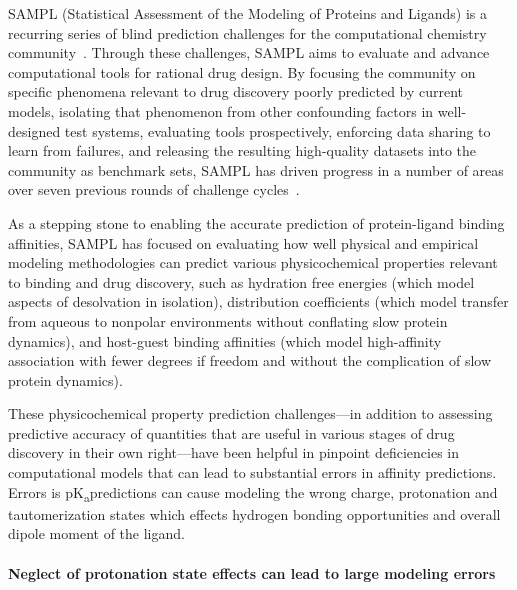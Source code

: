 \documentclass[9pt,lineno]{elife}
\newcommand{\pKa}{pK\textsubscript{a}}
\begin{document}
SAMPL (Statistical Assessment of the Modeling of Proteins and Ligands) is a recurring series of blind prediction challenges for the computational chemistry community~\citep{mobley_advancing_2016, sample_D3R_website}. Through these challenges, SAMPL aims to evaluate and advance computational tools for rational drug design. By focusing the community on specific phenomena relevant to drug discovery poorly predicted by current models, isolating that phenomenon from other confounding factors in well-designed test systems, evaluating tools prospectively, enforcing data sharing to learn from failures, and releasing the resulting high-quality datasets into the community as benchmark sets, SAMPL has driven progress in a number of areas over seven previous rounds of challenge cycles~\cite{nicholls_predicting_2008,guthrie_blind_2009,skillman_sampl2_2010,geballe_sampl2_2010,skillman_sampl3_2012,skillman_sampl3_2012,geballe_sampl3_2012,muddana_sampl3_2012,guthrie_sampl4_2014,Mobley:2014:JComputAidedMolDesa,muddana_sampl4_2014,mobley_blind_2014,yin_overview_2016,Bannan:2016:JComputAidedMolDes}.

As a stepping stone to enabling the accurate prediction of protein-ligand binding affinities, SAMPL has focused on evaluating how well physical and empirical modeling methodologies can predict various physicochemical properties relevant to binding and drug discovery, such as hydration free energies (which model aspects of desolvation in isolation), distribution coefficients (which model transfer from aqueous to nonpolar environments without conflating slow protein dynamics), and host-guest binding affinities (which model high-affinity association with fewer degrees if freedom and without the complication of slow protein dynamics).

These physicochemical property prediction challenges---in addition to assessing predictive accuracy of quantities that are useful in various stages of drug discovery in their own right---have been helpful in pinpoint deficiencies in computational models that can lead to substantial errors in affinity predictions. Errors is \pKa predictions can cause modeling the wrong charge, protonation and tautomerization states which effects hydrogen bonding opportunities and overall dipole moment of the ligand.

\paragraph{Neglect of protonation state effects can lead to large modeling errors}
\end{document}
